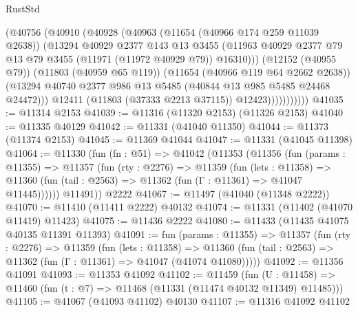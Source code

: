 \begin{lexlean}{RustStd}
\begin{coremodule}
                      (@40756
                        (@40910
                          (@40928
                            (@40963
                              (@11654 (@40966 @174 @259 @11039 @2638))
                              (@13294
                                @40929
                                @2377
                                @143
                                @13
                                @3455
                                (@11963
                                  @40929
                                  @2377
                                  @79
                                  @13
                                  @79
                                  @3455
                                  (@11971 (@11972 @40929 @79))
                                  @16310)))
                            (@12152 (@40955 @79))
                            (@11803 (@40959 @65 @119))
                            (@11654 (@40966 @119 @64 @2662 @2638))
                            (@13294
                              @40740
                              @2377
                              @986
                              @13
                              @5485
                              (@40844 @13 @985 @5485 @24468 @24472)))
                          @12411
                          (@11803 (@37333 @2213 @37115))
                          @12423)))))))))))
@41035 := @11314 @2153
@41039 := @11316 (@11320 @2153) (@11326 @2153)
@41040 := @11335 @40129
@41042 := @11331 (@41040 @11350)
@41044 := @11373 (@11374 @2153)
@41045 := @11369 @41044
@41047 := @11331 (@41045 @11398)
@41064 := @11330
    (fun (fn : @51) =>
    @41042
      (@11353
        (@11356
          (fun (params : @11355) =>
          @11357
            (fun (rty : @2276) =>
            @11359
              (fun (lets : @11358) =>
              @11360 (fun (tail : @2563) => @11362 (fun (Γ : @11361) => @41047 @11445))))))
        @11491))
    @2222
@41067 := @11497 (@41040 (@11348 @2222))
@41070 := @11410 (@11411 @2222) @40132
@41074 := @11331 (@11402 (@41070 @11419) @11423)
@41075 := @11436 @2222
@41080 := @11433 (@11435 @41075 @40135 @11391 @11393)
@41091 := fun (params : @11355) =>
  @11357
    (fun (rty : @2276) =>
    @11359
      (fun (lets : @11358) =>
      @11360 (fun (tail : @2563) => @11362 (fun (Γ : @11361) => @41047 (@41074 @41080)))))
@41092 := @11356 @41091
@41093 := @11353 @41092
@41102 := @11459
    (fun (U : @11458) => @11460 (fun (t : @7) => @11468 (@11331 (@11474 @40132 @11349) @11485)))
@41105 := @41067 (@41093 @41102) @40130
@41107 := @11316 @41092 @41102

\end{coremodule}
\end{lexlean}
